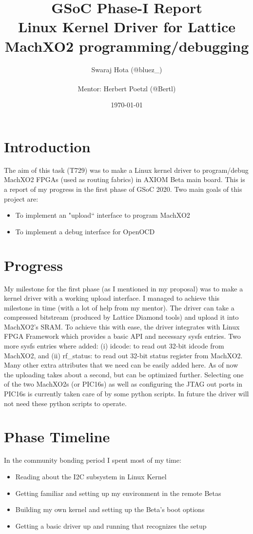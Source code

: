 \documentclass{article}
\title{{\Huge GSoC Phase-I Report} \\
{\vfill\huge Linux Kernel Driver for Lattice MachXO2 programming/debugging}}
\author{Swaraj Hota (@bluez\_) \\
\\Mentor: Herbert Poetzl (@Bertl)}
\date{\vfill\today}
\begin{document}
 
\selectfont
\maketitle 
\newpage
\tableofcontents
\newpage

\section{Introduction}
The aim of this task (T729) was to make a Linux kernel driver to program/debug
MachXO2 FPGAs (used as routing fabrics) in AXIOM Beta main board. This is a
report of my progress in
the first phase of GSoC 2020.\newline
Two main goals of this project are:
\begin{itemize}
\item To implement an "upload`` interface to program MachXO2
\item To implement a debug interface for OpenOCD
\end{itemize}

\section{Progress}
My milestone for the first phase (as I mentioned in my proposal) was to make a 
kernel driver with a working upload interface.
I managed to achieve this milestone in time (with a lot of help from my mentor). 
The driver can take a compressed bitstream 
(produced by Lattice Diamond tools) and upload it into MachXO2's SRAM. To
achieve this with ease, the driver integrates with Linux FPGA Framework which
provides a basic API and necessary sysfs entries. Two more sysfs entries where
added: (i) idcode: to read out 32-bit idcode from MachXO2, and (ii) rf\_status:
to read out 32-bit status register from MachXO2. Many other extra attributes 
that we need can be easily added here.\newline\newline
As of now the uploading takes about a
second, but can be optimized further. Selecting one of the two
MachXO2s (or PIC16s) as well as configuring the JTAG out ports in PIC16s is
currently taken care of by some python scripts. In future the driver will not
need these python scripts to operate.

\newpage

\section{Phase Timeline}
In the community bonding period I spent most of my time:
\begin{itemize}
\item Reading about the I2C subsystem in Linux Kernel 
\item Getting familiar and setting up my environment in the remote Betas 
\item Building my own kernel and setting up the Beta's boot options
\item Getting a basic driver up and running that recognizes the setup 
\end{itemize}
\end{document}
